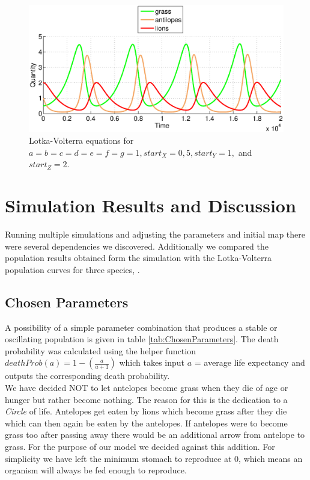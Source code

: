 \documentclass[11pt]{article}
\begin{document}
\begin{figure}
\centering
\includegraphics[scale=0.65]{LotkaVolterraThreeAllOnes}
\caption{Lotka-Volterra equations for $a=b=c=d=e=f=g=1,start_X=0,5, start_Y=1,$ and $start_Z=2$.}
\label{fig:LotkaVolterraThreeAllOnes}
\end{figure}

\section{Simulation Results and Discussion}
Running multiple simulations and adjusting the parameters and initial map there were several dependencies we discovered. Additionally we compared the population results obtained form the simulation with the Lotka-Volterra population curves for three species, \cite{lotkaVolterraThreeSpecies}. 

\subsection{Chosen Parameters}
A possibility of a simple parameter combination that produces a stable or oscillating population is given in table \ref{tab:ChosenParameters}.
The death probability was calculated using the helper function $deathProb(a) = 1-(\frac{a}{a+1})$ which takes input $a$ = average life expectancy and outputs the corresponding death probability.\\
We have decided NOT to let antelopes become grass when they die of age or hunger but rather become nothing. The reason for this is the dedication to a {\it Circle} of life. Antelopes get eaten by lions which become grass after they die which can then again be eaten by the antelopes. If antelopes were to become grass too after passing away there would be an additional arrow from antelope to grass. For the purpose of our model we decided against this addition. For simplicity we have left the minimum stomach to reproduce at 0, which means an organism will always be fed enough to reproduce.
\end{document}
